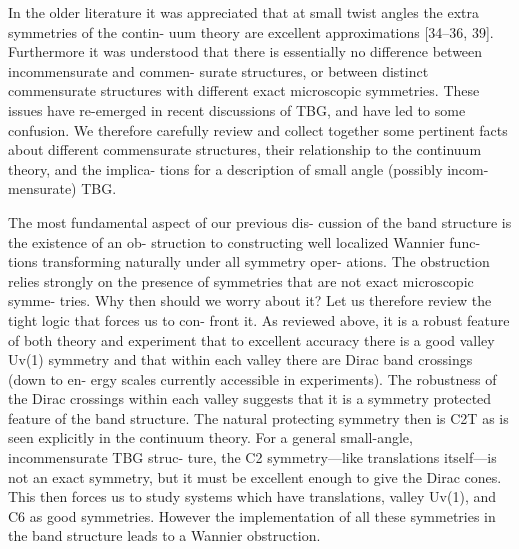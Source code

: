 In the older literature it was appreciated that at
small twist angles the extra symmetries of the contin-
uum theory are excellent approximations [34–36, 39].
Furthermore it was understood that there is essentially
no difference between incommensurate and commen-
surate structures, or between distinct commensurate
structures with different exact microscopic symmetries.
These issues have re-emerged in recent discussions of
TBG, and have led to some confusion. We therefore
carefully review and collect together some pertinent
facts about different commensurate structures, their
relationship to the continuum theory, and the implica-
tions for a description of small angle (possibly incom-
mensurate) TBG.

The most fundamental aspect of our previous dis-
cussion of the band structure is the existence of an ob-
struction to constructing well localized Wannier func-
tions transforming naturally under all symmetry oper-
ations. The obstruction relies strongly on the presence
of symmetries that are not exact microscopic symme-
tries.
Why then should we worry about it?
Let us
therefore review the tight logic that forces us to con-
front it. As reviewed above, it is a robust feature of
both theory and experiment that to excellent accuracy
there is a good valley Uv(1) symmetry and that within
each valley there are Dirac band crossings (down to en-
ergy scales currently accessible in experiments). The
robustness of the Dirac crossings within each valley
suggests that it is a symmetry protected feature of the
band structure. The natural protecting symmetry then
is C2T as is seen explicitly in the continuum theory.
For a general small-angle, incommensurate TBG struc-
ture, the C2 symmetry—like translations itself—is not
an exact symmetry, but it must be excellent enough
to give the Dirac cones. This then forces us to study
systems which have translations, valley Uv(1), and C6
as good symmetries. However the implementation of
all these symmetries in the band structure leads to a
Wannier obstruction.






%



